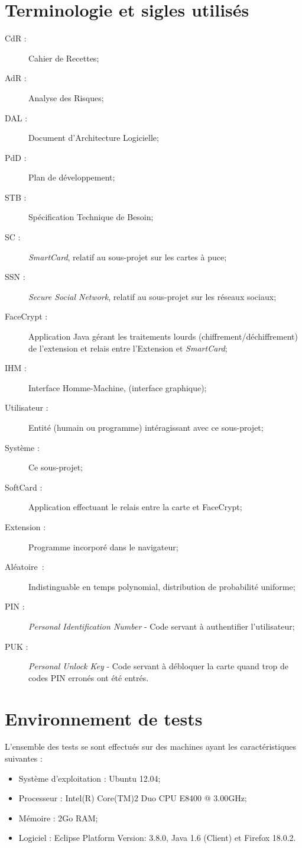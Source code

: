 \documentclass[a4paper,11pt,french]{article}
\begin{document}
\section{Terminologie et sigles utilisés}
\begin{description}
    \item[CdR :] Cahier de Recettes;
    \item[AdR :] Analyse des Risques;
    \item[DAL :] Document d'Architecture Logicielle;
    \item[PdD :] Plan de développement;
    \item[STB :] Spécification Technique de Besoin;
    \item[SC :] \emph{SmartCard}, relatif au sous-projet sur les cartes à puce;
    \item[SSN :] \emph{Secure Social Network}, relatif au sous-projet sur les
	réseaux sociaux;
    \item[FaceCrypt :] Application Java gérant les traitements lourds
	(chiffrement/déchiffrement) de l'extension et relais entre l'Extension
	et \emph{SmartCard};
    \item[IHM :] Interface Homme-Machine, (interface graphique);
    \item[Utilisateur :] Entité (humain ou programme) intéragissant avec ce
        sous-projet;
    \item[Système :] Ce sous-projet;
    \item[SoftCard :] Application effectuant le relais entre la carte et
	FaceCrypt;
    \item[Extension :] Programme incorporé dans le navigateur;
    \item[Aléatoire :] Indistinguable en temps polynomial, distribution de
	probabilité uniforme;
    \item[PIN :] \emph{Personal Identification Number} - Code servant à
	authentifier l'utilisateur;
    \item[PUK :] \emph{Personal Unlock Key} - Code servant à débloquer la
	carte quand trop de codes PIN erronés ont été entrés.
\end{description}

\section{Environnement de tests}
L'ensemble des tests se sont effectués sur des machines ayant les
caractéristiques suivantes :
\begin{itemize} 
	\item Système d'exploitation : Ubuntu 12.04;
	\item Processeur : Intel(R) Core(TM)2 Duo CPU E8400  @ 3.00GHz;
	\item Mémoire : 2Go RAM;
	\item Logiciel : Eclipse Platform Version: 3.8.0, Java 1.6 (Client) et
Firefox 18.0.2.
\end{itemize}
\end{document}
